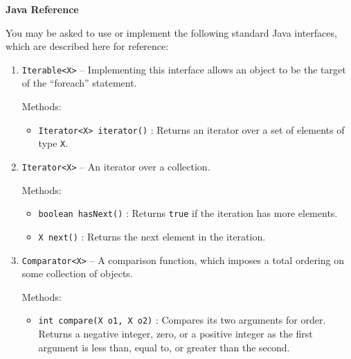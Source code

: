 \documentclass[12pt]{article}                   %
\begin{document}
\vfill\thispagestyle{empty}
\newpage

\begin{center}
{\bf Java Reference}
\end{center}
\noindent
You may be asked to use or implement the following standard Java
interfaces, which are described here for reference:

\begin{enumerate}
\item \texttt{Iterable<X>} -- Implementing this interface allows an object to be the target of the ``foreach'' statement. 

 Methods:
 \begin{itemize}
 \item \texttt{Iterator<X> iterator()} : Returns an iterator over a set of
  elements of type \texttt{X}.
  \end{itemize}

\item \texttt{Iterator<X>} -- An iterator over a collection.

  Methods:
  \begin{itemize}
    \item \texttt{boolean hasNext()} : Returns \texttt{true} if the iteration
      has more elements.
    \item \texttt{X next()} : Returns the next element in the iteration.
  \end{itemize}

\item \texttt{Comparator<X>} -- A comparison function, which imposes a total ordering on some collection of objects.

  Methods:
  \begin{itemize}
    \item \texttt{int compare(X o1, X o2)} : Compares its two
      arguments for order. Returns a negative integer, zero, or a
      positive integer as the first argument is less than, equal to,
      or greater than the second.
  \end{itemize}
  
\end{enumerate}

\newpage
\end{document}
